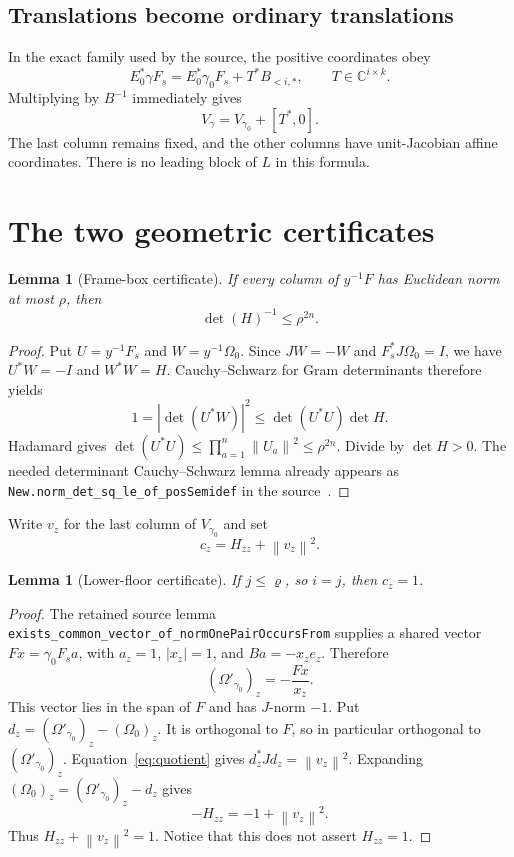 \documentclass[11pt,letterpaper]{article}
\newtheorem{lemma}[theorem]{Lemma}
\theoremstyle{remark}
\newcommand{\C}{\mathbb C}
\newcommand{\Id}{I}
\newcommand{\norm}[1]{\left\lVert#1\right\rVert}
\newcommand{\abs}[1]{\left|#1\right|}
\newcommand{\code}[1]{{\small\urlstyle{tt}\nolinkurl{#1}}}
\begin{document}
\subsection{Translations become ordinary translations}

In the exact family used by the source, the positive coordinates obey
\[
 E_0^*\gamma F_s=E_0^*\gamma_0F_s+T^*B_{<i,*},
 \qquad T\in\C^{i\times k}.
\]
Multiplying by $B^{-1}$ immediately gives
\begin{equation}\label{eq:translation}
 V_\gamma=V_{\gamma_0}+[T^*,0].
\end{equation}
The last column remains fixed, and the other columns have unit-Jacobian affine
coordinates. There is no leading block of $L$ in this formula.

\section{The two geometric certificates}\label{sec:certificates}

\begin{lemma}[Frame-box certificate]\label{lem:box}
If every column of $y^{-1}F$ has Euclidean norm at most $\rho$, then
\begin{equation}\label{eq:detbound}
 \det(H)^{-1}\leq\rho^{2n}.
\end{equation}
\end{lemma}

\begin{proof}
Put $U=y^{-1}F_s$ and $W=y^{-1}\Omega_0$. Since $JW=-W$ and
$F_s^*J\Omega_0=\Id$, we have $U^*W=-\Id$ and $W^*W=H$.
Cauchy--Schwarz for Gram determinants therefore yields
\[
 1=\abs{\det(U^*W)}^2\leq\det(U^*U)\det H.
\]
Hadamard gives $\det(U^*U)\leq\prod_{a=1}^n\norm{U_a}^2\leq\rho^{2n}$.
Divide by $\det H>0$. The needed determinant Cauchy--Schwarz lemma already
appears as \code{New.norm_det_sq_le_of_posSemidef} in the source~\cite{hermitian}.
\end{proof}

Write $v_z$ for the last column of $V_{\gamma_0}$ and set
\[
 c_z=H_{zz}+\norm{v_z}^2.
\]

\begin{lemma}[Lower-floor certificate]\label{lem:lower}
If $j\leq\varrho$, so $i=j$, then $c_z=1$.
\end{lemma}

\begin{proof}
The retained source lemma
\code{exists_common_vector_of_normOnePairOccursFrom} supplies a shared vector
$Fx=\gamma_0F_s a$, with $a_z=1$, $\abs{x_z}=1$, and
$Ba=-x_z e_z$. Therefore
\[
 (\Omega'_{\gamma_0})_z=-\frac{Fx}{x_z}.
\]
This vector lies in the span of $F$ and has $J$-norm $-1$.
Put $d_z=(\Omega'_{\gamma_0})_z-(\Omega_0)_z$. It is orthogonal to $F$, so in
particular orthogonal to $(\Omega'_{\gamma_0})_z$. Equation~\eqref{eq:quotient}
gives $d_z^*Jd_z=\norm{v_z}^2$. Expanding
$(\Omega_0)_z=(\Omega'_{\gamma_0})_z-d_z$ gives
\[
 -H_{zz}=-1+\norm{v_z}^2.
\]
Thus $H_{zz}+\norm{v_z}^2=1$. Notice that this does not assert $H_{zz}=1$.
\end{proof}
\end{document}
